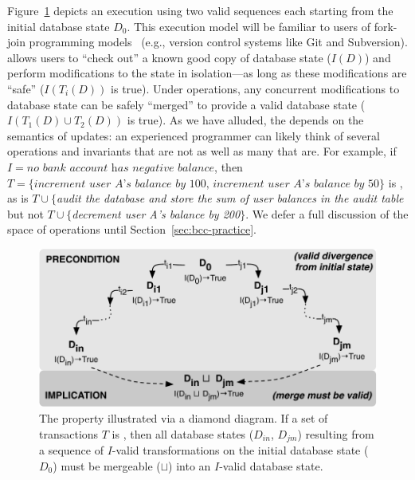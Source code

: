 Figure~\ref{fig:iconfluence} depicts an \iconfluent execution using
two valid sequences each starting from the initial database state
$D_0$. This execution model will be familiar to users of fork-join
programming models~\cite{hewitt-forkjoin} (e.g., version control
systems like Git and Subversion). \iconfluence allows users to ``check
out'' a known good copy of database state ($I(D)$) and perform
modifications to the state in isolation---as long as these
modifications are ``safe'' ($I(T_i(D))$ is true). Under \iconfluent
operations, any concurrent modifications to database state can be
safely ``merged'' to provide a valid database state ($I(T_1(D) \cup
T_2(D))$ is true). As we have alluded, the \iconfluence depends on the
semantics of updates: an experienced programmer can likely think of
several operations and invariants that are not \iconfluent as well as
many that are. For example, if $I=\textit{no bank account has negative
  balance}$, then $T=\{\textit{increment user A's balance by 100,
  increment user A's balance by 50}\}$ is \iconfluent, as is
  $T\cup\{$\textit{audit the database and store the sum of user
    balances in the \textrm{audit} table} but not
  $T\cup\{$\textit{decrement user A's balance by 200}$\}$. We defer a
  full discussion of the space of operations until
  Section~\ref{sec:bcc-practice}.

\begin{figure}
\begin{center}
\includegraphics[width=\columnwidth]{figs/icommute.pdf}
\end{center}
\caption{The \iconfluence property illustrated via a diamond
  diagram. If a set of transactions $T$ is \iconfluent, then all
  database states ($D_{in}$, $D_{jm}$) resulting from a sequence of
  $I$-valid transformations on the initial database state ($D_0$) must
  be mergeable ($\sqcup$) into an $I$-valid database state.}
\label{fig:iconfluence}
\end{figure}

